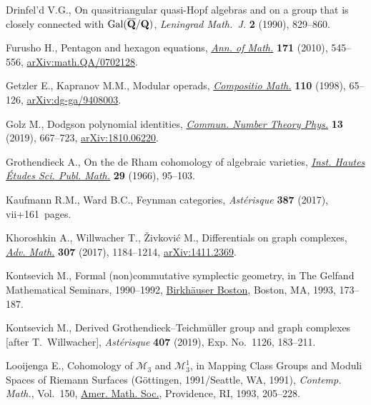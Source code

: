 \documentclass[pdftex]{sigma}%
\numberwithin{equation}{section}
\newcommand{\0}{\color{blue}{\mathsf{0}}}
\begin{document}
\begin{thebibliography}{99}
Drinfel'd V.G., On quasitriangular quasi-{H}opf algebras and on a group that is
 closely connected with {${\rm Gal}(\overline{\bf Q}/{\bf Q})$},
 \textit{Leningrad Math.~J.} \textbf{2} (1990), 829--860.

Furusho H., Pentagon and hexagon equations, \href{https://doi.org/10.4007/annals.2010.171.545}{\textit{Ann. of Math.}} \textbf{171}
 (2010), 545--556, \href{https://arxiv.org/abs/math.QA/0702128}{arXiv:math.QA/0702128}.

Getzler E., Kapranov M.M., Modular operads, \href{https://doi.org/10.1023/A:1000245600345}{\textit{Compositio Math.}}
 \textbf{110} (1998), 65--126, \href{https://arxiv.org/abs/dg-ga/9408003}{arXiv:dg-ga/9408003}.

Golz M., Dodgson polynomial identities, \href{https://doi.org/10.4310/CNTP.2019.v13.n4.a1}{\textit{Commun. Number Theory Phys.}}
 \textbf{13} (2019), 667--723, \href{https://arxiv.org/abs/1810.06220}{arXiv:1810.06220}.

Grothendieck A., On the de {R}ham cohomology of algebraic varieties,
 \href{https://doi.org/10.1007/BF02684807}{\textit{Inst. Hautes \'Etudes Sci. Publ. Math.}} \textbf{29} (1966), 95--103.

Kaufmann R.M., Ward B.C., Feynman categories, \textit{Ast\'erisque}
 \textbf{387} (2017), vii+161~pages.

Khoroshkin A., Willwacher T., \v{Z}ivkovi\'{c} M., Differentials on graph
 complexes, \href{https://doi.org/10.1016/j.aim.2016.05.029}{\textit{Adv. Math.}} \textbf{307} (2017), 1184--1214,
 \href{https://arxiv.org/abs/1411.2369}{arXiv:1411.2369}.

Kontsevich M., Formal (non)commutative symplectic geometry, in The {G}elfand
 {M}athematical {S}eminars, 1990--1992, \href{https://doi.org/10.1007/978-1-4612-0345-2_11}{Birkh\"auser Boston}, Boston, MA,
 1993, 173--187.

Kontsevich M., Derived {G}rothendieck--{T}eichm\"{u}ller group and graph
 complexes [after {T}.~{W}illwacher], \textit{Ast\'e\-risque} \textbf{407}
 (2019), Exp. No.~1126, 183--211.

Looijenga E., Cohomology of {${\mathcal M}_3$} and {${\mathcal M}^1_3$}, in
 Mapping Class Groups and Moduli Spaces of {R}iemann Surfaces ({G}\"ottingen,
 1991/{S}eattle, {WA}, 1991), \textit{Contemp. Math.}, Vol.~150, \href{https://doi.org/10.1090/conm/150/01292}{Amer. Math.
 Soc.}, Providence, RI, 1993, 205--228.


\end{thebibliography}
\end{document}
